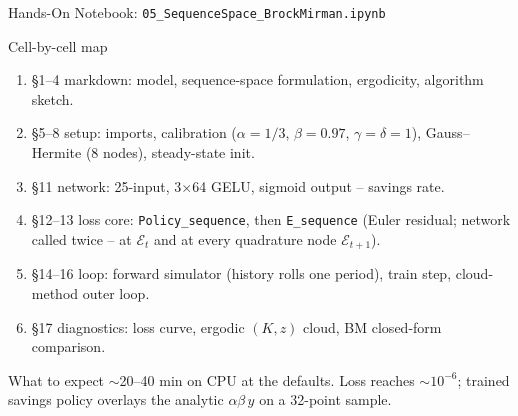 \documentclass[aspectratio=169,11pt]{beamer}
\newcommand{\emphc}[1]{\textcolor{harvardcrimson}{#1}}
\newcommand{\histE}{\mathcal{E}}  %
\begin{document}
\begin{frame}{Hands-On Notebook: \texttt{05\_SequenceSpace\_BrockMirman.ipynb}}
\footnotesize
\begin{block}{Cell-by-cell map}
\vspace{-2pt}\begin{enumerate}\itemsep0pt
    \item \emphc{\S 1--4 markdown:} model, sequence-space formulation, ergodicity, algorithm sketch.
    \item \emphc{\S 5--8 setup:} imports, calibration ($\alpha = 1/3$, $\beta = 0.97$, $\gamma = \delta = 1$), Gauss--Hermite (8 nodes), steady-state init.
    \item \emphc{\S 11 network:} 25-input, 3$\times$64 GELU, sigmoid output -- savings rate.
    \item \emphc{\S 12--13 loss core:} \texttt{Policy\_sequence}, then \texttt{E\_sequence} (Euler residual; network called twice -- at $\histE_t$ and at every quadrature node $\histE_{t+1}$).
    \item \emphc{\S 14--16 loop:} forward simulator (history rolls one period), train step, cloud-method outer loop.
    \item \emphc{\S 17 diagnostics:} loss curve, ergodic $(K, z)$ cloud, BM closed-form comparison.
\end{enumerate}
\end{block}
\vspace{-2pt}
\begin{block}{What to expect}
\vspace{-2pt}$\sim$20--40 min on CPU at the defaults.  Loss reaches $\sim 10^{-6}$; trained savings policy overlays the analytic $\alpha\beta\,y$ on a 32-point sample.
\end{block}
\end{frame}


\end{document}
